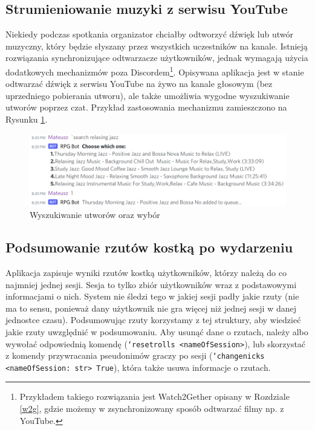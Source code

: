\documentclass[shortabstract,inz]{iithesis}
\begin{document}
			\subsection{Strumieniowanie muzyki z serwisu YouTube}
			Niekiedy podczas spotkania organizator chciałby odtworzyć dźwięk lub utwór muzyczny, który będzie słyszany przez wszystkich uczestników na kanale. Istnieją rozwiązania synchronizujące odtwarzacze użytkowników, jednak wymagają użycia dodatkowych mechanizmów poza Discordem\footnote{Przykładem takiego rozwiązania jest Watch2Gether opisany w Rozdziale \ref{w2g}, gdzie możemy w zsynchronizowany sposób odtwarzać filmy np. z YouTube.}. Opisywana aplikacja jest w stanie odtwarzać dźwięk z serwisu YouTube na żywo na kanale głosowym (bez uprzedniego pobierania utworu), ale także umożliwia wygodne wyszukiwanie utworów poprzez czat. Przykład zastosowania mechanizmu zamieszczono na Rysunku \ref{musicBotSearch}.
	
			\begin{figure}[h!]
					\includegraphics[width=1\textwidth]{musicExample}
					\caption{Wyszukiwanie utworów oraz wybór}
					\label{musicBotSearch}
			\end{figure}
	
			\subsection{Podsumowanie rzutów kostką po wydarzeniu}
			Aplikacja zapisuje wyniki rzutów kostką użytkowników, którzy należą do co najmniej jednej sesji. Sesja to tylko zbiór użytkowników wraz z podstawowymi informacjami o nich. System nie śledzi tego w jakiej sesji padły jakie rzuty (nie ma to sensu, ponieważ dany użytkownik nie gra więcej niż jednej sesji w danej jednostce czasu). Podsumowując rzuty korzystamy z tej struktury, aby wiedzieć jakie rzuty uwzględnić w podsumowaniu. Aby usunąć dane o rzutach, należy albo wywołać odpowiednią komendę (\texttt{`resetrolls <nameOfSession>}), lub skorzystać z komendy przywracania pseudonimów graczy po sesji (\texttt{`changenicks <nameOfSession: str> True}), która także usuwa informacje o rzutach.
			
\end{document}
